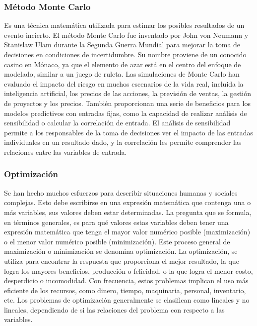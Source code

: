 \documentclass[11pt, letterpaper, spanish]{article}
\begin{document}
{\subsubsection{Método Monte Carlo}
\par{Es una técnica matemática utilizada para estimar los posibles resultados de un evento incierto. El método Monte Carlo fue inventado por John von Neumann y Stanislaw Ulam durante la Segunda Guerra Mundial para mejorar la toma de decisiones en condiciones de incertidumbre. Su nombre proviene de un conocido casino en Mónaco, ya que el elemento de azar está en el centro del enfoque de modelado, similar a un juego de ruleta. Las simulaciones de Monte Carlo han evaluado el impacto del riesgo en muchos escenarios de la vida real, incluida la inteligencia artificial, los precios de las acciones, la previsión de ventas, la gestión de proyectos y los precios. También proporcionan una serie de beneficios para los modelos predictivos con entradas fijas, como la capacidad de realizar análisis de sensibilidad o calcular la correlación de entrada. El análisis de sensibilidad permite a los responsables de la toma de decisiones ver el impacto de las entradas individuales en un resultado dado, y la correlación les permite comprender las relaciones entre las variables de entrada\cite{garfinkel_shevtsov_guo_2017}.}
\subsubsection{Optimización}
\par{Se han hecho muchos esfuerzos para describir situaciones humanas y sociales complejas. Esto debe escribirse en una expresión matemática que contenga una o más variables, sus valores deben estar determinadas. La pregunta que se formula, en términos generales, es para qué valores estas variables deben tener una expresión matemática que tenga el mayor valor numérico posible (maximización) o el menor valor numérico posible (minimización). Este proceso general de maximización o minimización se denomina optimización. La optimización, se utiliza para encontrar la respuesta que proporciona el mejor resultado, la que logra los mayores beneficios, producción o felicidad, o la que logra el menor costo, desperdicio o incomodidad. Con frecuencia, estos problemas implican el uso más eficiente de los recursos, como dinero, tiempo, maquinaria, personal, inventario, etc. Los problemas de optimización generalmente se clasifican como lineales y no lineales, dependiendo de si las relaciones del problema con respecto a las variables.\cite{Arsham_1996}}
}
\end{document}

